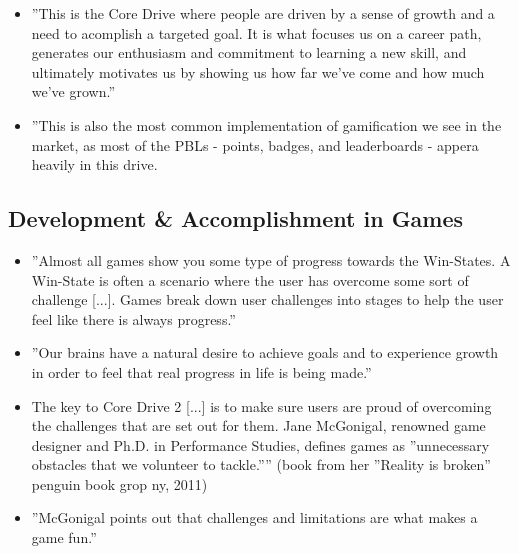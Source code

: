 \begin{itemize}
    \item ''This is the Core Drive where people are driven by a sense of growth and a need to acomplish a targeted goal. It is what focuses us on a career path, generates our enthusiasm and commitment to learning a new skill, and ultimately motivates us by showing us how far we've come and how much we've grown.''
    \item ''This is also the most common implementation of gamification we see in the market, as most of the PBLs - points, badges, and leaderboards - appera heavily in this drive.
\end{itemize}

\subsection{Development \& Accomplishment in Games}
\begin{itemize}
    \item ''Almost all games show you some type of progress towards the Win-States. A Win-State is often a scenario where the user has overcome some sort of challenge [...]. Games break down user challenges into stages to help the user feel like there is always progress.''
    \item ''Our brains have a natural desire to achieve goals and to experience growth in order to feel that real progress in life is being made.''
    \item The key to Core Drive 2 [...] is to make sure users are proud of overcoming the challenges that are set out for them. Jane McGonigal, renowned game designer and Ph.D. in Performance Studies, defines games as ''unnecessary obstacles that we volunteer to tackle.'''' (book from her ''Reality is broken'' penguin book grop ny, 2011)
    \item ''McGonigal points out that challenges and limitations are what makes a game fun.''
\end{itemize}

